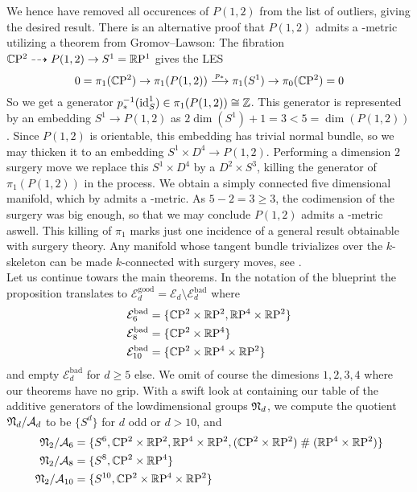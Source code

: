 We hence have removed all occurences of $P(1,2)$ from the list of outliers, giving the desired result.
\endprf
There is an alternative proof that $P(1,2)$ admits a \psc-metric utilizing a theorem from Gromov--Lawson:
The fibration $\mathbb{C}\mathrm{P}^2 \dashrightarrow P(1,2) \to S^1 = \mathbb{R}\mathrm{P}^1$ gives the LES
\begin{equation*}
    0 = \pi_1(\mathbb{C}\mathrm{P}^2) \to \pi_1(P(1,2)) \overset{p_\ast}{\longrightarrow} \pi_1(S^1) \to \pi_0(\mathbb{C}\mathrm{P}^2) = 0
\end{equation*}
So we get a generator $p_\ast^{-1}(\operatorname{id}_S^1) \in \pi_1(P(1,2)) \cong \mathbb{Z}$.
This generator is represented by an embedding $S^1\to P(1,2)$ as $2\dim(S^1) + 1 = 3 < 5 = \dim(P(1,2))$. 
Since $P(1,2)$ is orientable, this embedding has trivial normal bundle, so we may thicken it to an embedding $S^1\times D^{4} \to P(1,2)$.
Performing a dimension $2$ surgery move we replace this $S^1\times D^{4}$ by a $D^2 \times S^3$, killing the generator of $\pi_1(P(1,2))$ in the process.
We obtain a simply connected five dimensional manifold, which by \cite{gl:scpsc} admits a \psc-metric.
As $5-2 = 3 \geq 3$, the codimension of the surgery was big enough, so that we may conclude $P(1,2)$ admits a \psc-metric aswell.
This killing of $\pi_1$ marks just one incidence of a general result obtainable with surgery theory. 
Any manifold whose tangent bundle trivializes over the $k$-skeleton can be made $k$-connected with surgery moves, see \cite{milnor:surg}.\\
Let us continue towars the main theorems.
In the notation of the {\color{themecolordark} blueprint} the proposition translates to $\mathcal{E}_d^{\text{good}} = \mathcal{E}_d\setminus \mathcal{E}_d^{\text{bad}}$ where 
\begin{equation*}
    \begin{split}
        \mathcal{E}_6^\text{bad} &= \{\mathbb{C}\mathrm{P}^2\times\mathbb{R}\mathrm{P}^2, \mathbb{R}\mathrm{P}^4\times\mathbb{R}\mathrm{P}^2\}\\
        \mathcal{E}_8^\text{bad} &= \{\mathbb{C}\mathrm{P}^2\times\mathbb{R}\mathrm{P}^4\}\\
        \mathcal{E}_{10}^\text{bad} &= \{\mathbb{C}\mathrm{P}^2\times\mathbb{R}\mathrm{P}^4\times \mathbb{R}\mathrm{P}^2\}
    \end{split}
\end{equation*}
and empty $\mathcal{E}_d^\text{bad}$ for $d\geq 5$ else. 
We omit of course the dimesions $1,2,3,4$ where our theorems have no grip.
With a swift look at  containing our table of the additive generators of the lowdimensional groups $\mathfrak{N}_d$, we compute the quotient $\mathfrak{N}_d/\mathcal{A}_d$ to be $\{S^d\}$ for $d$ odd or $d>10$, and 
\begin{equation*}
    \begin{split}
        \mathfrak{N}_2/\mathcal{A}_6 &= \{S^6, \mathbb{C}\mathrm{P}^2\times\mathbb{R}\mathrm{P}^2, \mathbb{R}\mathrm{P}^4\times\mathbb{R}\mathrm{P}^2, (\mathbb{C}\mathrm{P}^2\times\mathbb{R}\mathrm{P}^2) \mathrel\# (\mathbb{R}\mathrm{P}^4\times\mathbb{R}\mathrm{P}^2)\}\\
        \mathfrak{N}_2/\mathcal{A}_8 &= \{S^8, \mathbb{C}\mathrm{P}^2\times\mathbb{R}\mathrm{P}^4\}\\
        \mathfrak{N}_2/\mathcal{A}_{10} &= \{S^{10}, \mathbb{C}\mathrm{P}^2\times\mathbb{R}\mathrm{P}^4\times\mathbb{R}\mathrm{P}^2\}
    \end{split}
\end{equation*}
